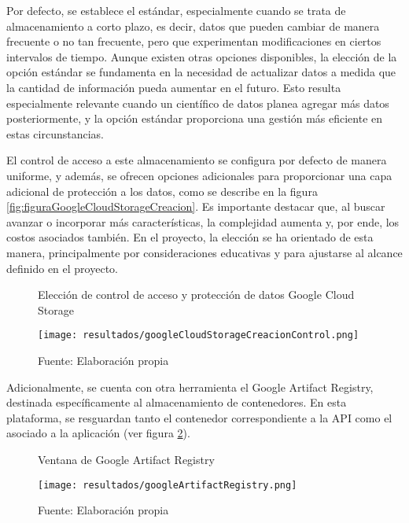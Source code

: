 \newpage

Por defecto, se establece el estándar, especialmente cuando se trata de almacenamiento a corto plazo, es decir, datos que pueden cambiar de manera frecuente o no tan frecuente, pero que experimentan modificaciones en ciertos intervalos de tiempo. Aunque existen otras opciones disponibles, la elección de la opción estándar se fundamenta en la necesidad de actualizar datos a medida que la cantidad de información pueda aumentar en el futuro. Esto resulta especialmente relevante cuando un científico de datos planea agregar más datos posteriormente, y la opción estándar proporciona una gestión más eficiente en estas circunstancias. \newline

El control de acceso a este almacenamiento se configura por defecto de manera uniforme, y además, se ofrecen opciones adicionales para proporcionar una capa adicional de protección a los datos, como se describe en la figura \ref{fig:figuraGoogleCloudStorageCreacion}. Es importante destacar que, al buscar avanzar o incorporar más características, la complejidad aumenta y, por ende, los costos asociados también. En el proyecto, la elección se ha orientado de esta manera, principalmente por consideraciones educativas y para ajustarse al alcance definido en el proyecto.

\newpage

\begin{figure}[h]
	\centering
	\caption{Elección de control de acceso y protección de datos Google Cloud Storage}
	\texttt{[image: resultados/googleCloudStorageCreacionControl.png]}
	\caption*{\footnotesize Fuente: Elaboración propia}
	\label{fig:figuraGoogleCloudStorageCreacionControl}
\end{figure}

Adicionalmente, se cuenta con otra herramienta el Google Artifact Registry, destinada específicamente al almacenamiento de contenedores. En esta plataforma, se resguardan tanto el contenedor correspondiente a la API como el asociado a la aplicación (ver figura \ref{fig:figuraGoogleArtifactRegistry}).

\newpage

\begin{figure}[h]
	\centering
	\caption{Ventana de Google Artifact Registry}
	\texttt{[image: resultados/googleArtifactRegistry.png]}
	\caption*{\footnotesize Fuente: Elaboración propia}
	\label{fig:figuraGoogleArtifactRegistry}
\end{figure}

